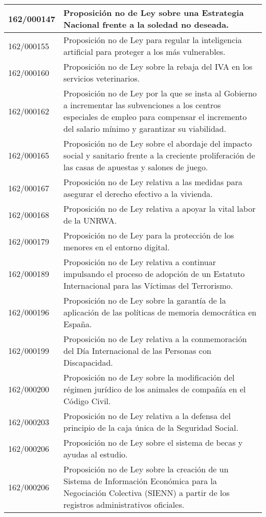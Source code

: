 {\begin{table}[H]
\begin{center}
\begin{tabularx}{\linewidth}{| l | X |}
\hline
162/000147 & Proposición no de Ley sobre una Estrategia Nacional frente a la soledad no deseada. \\
\hline
162/000155 & Proposición no de Ley para regular la inteligencia artificial para proteger a los más vulnerables. \\
\hline
162/000160 & Proposición no de Ley sobre la rebaja del IVA en los servicios veterinarios. \\
\hline
162/000162 & Proposición no de Ley por la que se insta al Gobierno a incrementar las subvenciones a los centros especiales de empleo para compensar el incremento del salario mínimo y garantizar su viabilidad. \\
\hline
162/000165 & Proposición no de Ley sobre el abordaje del impacto social y sanitario frente a la creciente proliferación de las casas de apuestas y salones de juego. \\
\hline
162/000167 & Proposición no de Ley relativa a las medidas para asegurar el derecho efectivo a la vivienda. \\
\hline
162/000168 & Proposición no de Ley relativa a apoyar la vital labor de la UNRWA. \\
\hline
162/000179 & Proposición no de Ley para la protección de los menores en el entorno digital. \\
\hline
162/000189 & Proposición no de Ley relativa a continuar impulsando el proceso de adopción de un Estatuto Internacional para las Víctimas del Terrorismo. \\
\hline
162/000196 & Proposición no de Ley sobre la garantía de la aplicación de las políticas de memoria democrática en España. \\
\hline
162/000199 & Proposición no de Ley relativa a la conmemoración del Día Internacional de las Personas con Discapacidad. \\
\hline
162/000200 & Proposición no de Ley sobre la modificación del régimen jurídico de los animales de compañía en el Código Civil. \\
\hline
162/000203 & Proposición no de Ley relativa a la defensa del principio de la caja única de la Seguridad Social. \\
\hline
162/000206 & Proposición no de Ley sobre el sistema de becas y ayudas al estudio. \\
\hline
162/000206 & Proposición no de Ley sobre la creación de un Sistema de Información Económica para la Negociación Colectiva (SIENN) a partir de los registros administrativos oficiales. \\
\hline

\end{tabularx}
\end{center}
\end{table}}
